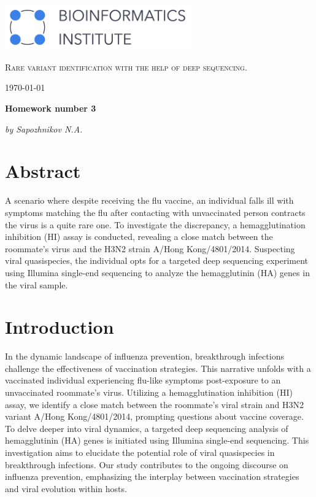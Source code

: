 \documentclass{scrartcl}
\begin{document}
\begin{titlepage}
	\centering
	\includegraphics[width=0.6\textwidth]{Graphics/BI_logo.png}\par
	\vspace{5cm}

	{\scshape\huge Rare variant identification with the help of deep sequencing. \par} 
	\vspace{1cm}
	{\Large \today\par}
	\vfill
	
	{\huge\bfseries Homework number 3\par}
	\vfill
	
	{\Large\itshape by Sapozhnikov N.A.}\par
	\vspace{1.5cm}

	\vfill


	\vfill
\end{titlepage}

\newpage
\section{Abstract}
A scenario where despite receiving the flu vaccine, an individual falls ill with symptoms matching the flu after contacting with unvaccinated person contracts the virus is a quite rare one. To investigate the discrepancy, a hemagglutination inhibition (HI) assay is conducted, revealing a close match between the roommate's virus and the H3N2 strain A/Hong Kong/4801/2014. Suspecting viral quasispecies, the individual opts for a targeted deep sequencing experiment using Illumina single-end sequencing to analyze the hemagglutinin (HA) genes in the viral sample.

\section{Introduction}
In the dynamic landscape of influenza prevention, breakthrough infections challenge the effectiveness of vaccination strategies. This narrative unfolds with a vaccinated individual experiencing flu-like symptoms post-exposure to an unvaccinated roommate's virus. Utilizing a hemagglutination inhibition (HI) assay, we identify a close match between the roommate's viral strain and H3N2 variant A/Hong Kong/4801/2014, prompting questions about vaccine coverage. To delve deeper into viral dynamics, a targeted deep sequencing analysis of hemagglutinin (HA) genes is initiated using Illumina single-end sequencing. This investigation aims to elucidate the potential role of viral quasispecies in breakthrough infections. Our study contributes to the ongoing discourse on influenza prevention, emphasizing the interplay between vaccination strategies and viral evolution within hosts.
\end{document}
